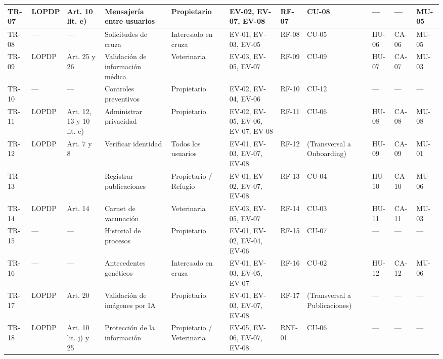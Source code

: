 \documentclass[journal,onecolumn]{IEEEtran}
\begin{document}
\begin{landscape}
\begin{longtable}{@{}p{0.8cm} p{1.3cm} p{1.5cm} p{2.2cm} p{1.5cm} p{1.8cm} p{1.6cm} p{1.3cm} p{1.3cm} p{1.3cm} p{1.5cm}@{}}
			TR-07 & LOPDP & Art. 10 lit. e) & Mensajería entre usuarios & Propietario & EV-02, EV-07, EV-08 & RF-07 & CU-08 & --- & --- & MU-05 \\ \midrule
			
			TR-08 & --- & --- & Solicitudes de cruza & Interesado en cruza & EV-01, EV-03, EV-05 & RF-08 & CU-05 & HU-06 & CA-06 & MU-05 \\ \midrule
			
			TR-09 & LOPDP & Art. 25 y 26 & Validación de información médica & Veterinaria & EV-03, EV-05, EV-07 & RF-09 & CU-09 & HU-07 & CA-07 & MU-03 \\ \midrule
			
			TR-10 & --- & --- & Controles preventivos & Propietario & EV-02, EV-04, EV-06 & RF-10 & CU-12 & --- & --- & --- \\ \midrule
			
			TR-11 & LOPDP & Art. 12, 13 y 10 lit. e) & Administrar privacidad & Propietario & EV-02, EV-05, EV-06, EV-07, EV-08 & RF-11 & CU-06 & HU-08 & CA-08 & MU-08 \\ \midrule
			
			TR-12 & LOPDP & Art. 7 y 8 & Verificar identidad & Todos los usuarios & EV-01, EV-03, EV-07, EV-08 & RF-12 & (Transversal a Onboarding) & HU-09 & CA-09 & MU-01 \\ \midrule
			
			TR-13 & --- & --- & Registrar publicaciones & Propietario / Refugio & EV-01, EV-02, EV-07, EV-08 & RF-13 & CU-04 & HU-10 & CA-10 & MU-06 \\ \midrule
			
			TR-14 & LOPDP & Art. 14 & Carnet de vacunación & Veterinaria & EV-03, EV-05, EV-07 & RF-14 & CU-03 & HU-11 & CA-11 & MU-03 \\ \midrule
			
			TR-15 & --- & --- & Historial de procesos & Propietario & EV-01, EV-02, EV-04, EV-06 & RF-15 & CU-07 & --- & --- & --- \\ \midrule
			
			TR-16 & --- & --- & Antecedentes genéticos & Interesado en cruza & EV-01, EV-03, EV-05, EV-07 & RF-16 & CU-02 & HU-12 & CA-12 & MU-06 \\ \midrule
			
			TR-17 & LOPDP & Art. 20 & Validación de imágenes por IA & Propietario & EV-01, EV-03, EV-07, EV-08 & RF-17 & (Transversal a Publicaciones) & --- & --- & --- \\ \midrule
			
			TR-18 & LOPDP & Art. 10 lit. j) y 25 & Protección de la información & Propietario / Veterinaria & EV-05, EV-06, EV-07, EV-08 & RNF-01 & CU-06 & --- & --- & --- \\ \midrule
			

\end{longtable}
\end{landscape}
\end{document}
